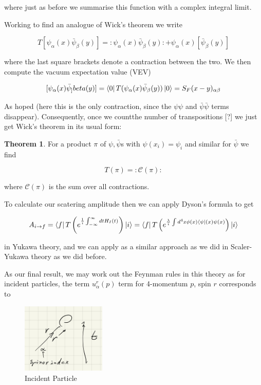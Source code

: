 \documentclass{article}
\theoremstyle{definition}
\newtheorem{theorem}{Theorem}
\begin{document}
where just as before we summarise this function with a complex integral limit.

Working to find an analogue of Wick's theorem we write

$$ T[\psi_\alpha(x) \bar{\psi}_\beta(y)] = : \psi_\alpha(x) \bar{\psi}_\beta(y)
: + \psi_\alpha(x) [\bar{\psi}_\beta(y)] $$

where the last square brackets denote a contraction between the two. We then
compute the vacuum expectation value (VEV)

$$ [\psi_\alpha(x) \bar{\psi}_]beta(y)] = \bra{0} T(\psi_\alpha(x)
\bar{\psi}_\beta(y)) \ket{0} = S_F(x - y)_{\alpha \beta} $$


As hoped (here this is the only contraction, since the $\psi \psi$ and
$\bar{\psi} \bar{\psi}$ terms disappear). Consequently, once we countthe number
of transpositions [?] we just get Wick's theorem in its usual form:

\begin{theorem}
For a product $\pi$ of $\psi, \bar{\psi}$s with $\psi(x_i) = \psi_i$ and similar
for $\bar{\psi}$ we find

$$ T(\pi) = :\mathcal{C}(\pi): $$

where $\mathcal{C}(\pi)$ is the sum over all contractions.
\end{theorem}

To calculate our scatering amplitude then we can apply Dyson's formula to get

$$ A_{i \to f} = \bra{f} T \left( e^{\frac{1}{i} \int_{-\infty}^\infty dt
  H_I(t)} \right) \ket{i} = \bra{f} T \left( e^{\frac{\lambda}{i} \int d^4x
    \phi(x) \bra{\psi}(x) \psi(x)} \right) \ket{i} $$

in Yukawa theory, and we can apply as a similar approach as we did in
Scaler-Yukawa theory as we did before. 

As our final result, we may work out the Feynman rules in this theory as for
incident particles, the term $u_\alpha^r(p)$ term for 4-momentum $p$, spin $r$
corresponds to

\begin{figure}[H]
  \centering
  \includegraphics[width=4cm]{res/QFT/feynman_incident_particle}
  \caption{Incident Particle}
  \label{feynman_incident_particle}
\end{figure}
\end{document}
